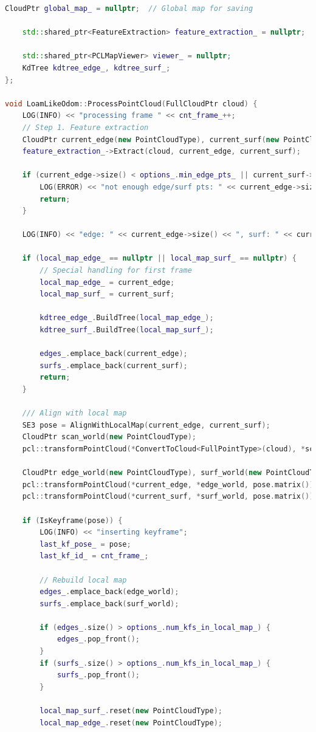 \begin{lstlisting}[language=c++,caption=src/ch7/loam-like/loam\_like\_odom.cc]
	CloudPtr global_map_ = nullptr;  // Global map for saving
	
	std::shared_ptr<FeatureExtraction> feature_extraction_ = nullptr;
	
	std::shared_ptr<PCLMapViewer> viewer_ = nullptr;
	KdTree kdtree_edge_, kdtree_surf_;
};

void LoamLikeOdom::ProcessPointCloud(FullCloudPtr cloud) {
	LOG(INFO) << "processing frame " << cnt_frame_++;
	// Step 1. Feature extraction
	CloudPtr current_edge(new PointCloudType), current_surf(new PointCloudType);
	feature_extraction_->Extract(cloud, current_edge, current_surf);
	
	if (current_edge->size() < options_.min_edge_pts_ || current_surf->size() < options_.min_surf_pts_) {
		LOG(ERROR) << "not enough edge/surf pts: " << current_edge->size() << "," << current_surf->size();
		return;
	}
	
	LOG(INFO) << "edge: " << current_edge->size() << ", surf: " << current_surf->size();
	
	if (local_map_edge_ == nullptr || local_map_surf_ == nullptr) {
		// Special handling for first frame
		local_map_edge_ = current_edge;
		local_map_surf_ = current_surf;
		
		kdtree_edge_.BuildTree(local_map_edge_);
		kdtree_surf_.BuildTree(local_map_surf_);
		
		edges_.emplace_back(current_edge);
		surfs_.emplace_back(current_surf);
		return;
	}
	
	/// Align with local map
	SE3 pose = AlignWithLocalMap(current_edge, current_surf);
	CloudPtr scan_world(new PointCloudType);
	pcl::transformPointCloud(*ConvertToCloud<FullPointType>(cloud), *scan_world, pose.matrix());
	
	CloudPtr edge_world(new PointCloudType), surf_world(new PointCloudType);
	pcl::transformPointCloud(*current_edge, *edge_world, pose.matrix());
	pcl::transformPointCloud(*current_surf, *surf_world, pose.matrix());
	
	if (IsKeyframe(pose)) {
		LOG(INFO) << "inserting keyframe";
		last_kf_pose_ = pose;
		last_kf_id_ = cnt_frame_;
		
		// Rebuild local map
		edges_.emplace_back(edge_world);
		surfs_.emplace_back(surf_world);
		
		if (edges_.size() > options_.num_kfs_in_local_map_) {
			edges_.pop_front();
		}
		if (surfs_.size() > options_.num_kfs_in_local_map_) {
			surfs_.pop_front();
		}
		
		local_map_surf_.reset(new PointCloudType);
		local_map_edge_.reset(new PointCloudType);
		

\end{lstlisting}
